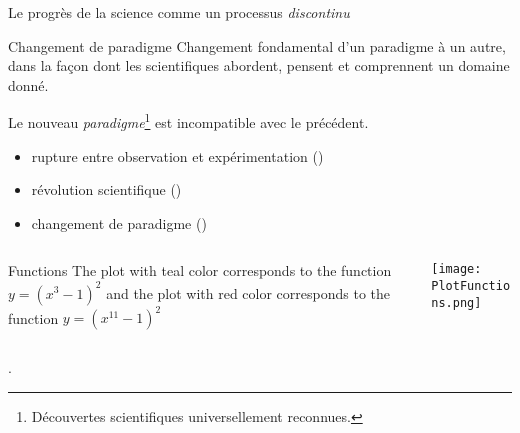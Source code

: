 \begin{frame}{Le progrès de la science comme un processus \textit{discontinu}}
\begin{block}{Changement de paradigme}
Changement fondamental d'un paradigme à un autre, dans la façon dont les scientifiques abordent, pensent et comprennent un domaine donné.
\end{block}
Le nouveau \textit{paradigme}\footnote{Découvertes scientifiques universellement reconnues.} est incompatible avec le précédent.
\begin{itemize}
\item \og{}rupture entre observation et expérimentation\fg{} 
{\footnotesize(\cite{bachelard1934formation})}
\item \og{}révolution scientifique\fg{} {\footnotesize(\cite{koyre1957closed})}
\item \og{}changement de paradigme\fg{} {\footnotesize(\cite{kuhn1962structure})} 
\end{itemize} 
\begin{columns}[c]
\begin{column}{.5\textwidth}
    
    \begin{block}{Functions}
    The plot with teal color corresponds to the function $y=(x^3-1)^2$ and the plot with red color corresponds to the function $y=(x^{11}-1)^2$ 
    \end{block}
\end{column}
\begin{column}{.5\textwidth}
\centering
    \texttt{[image: PlotFunctions.png]}
\end{column}
\end{columns}.
\end{frame}
